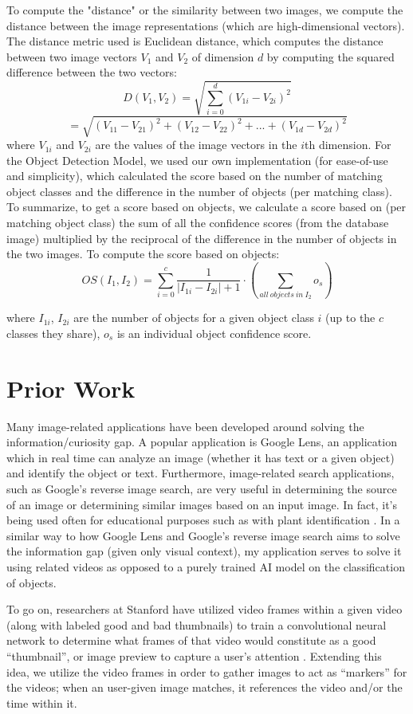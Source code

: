 \documentclass[10pt,twocolumn]{article}
\begin{document}
To compute the "distance" or the similarity between two images, we compute the distance between the image representations (which are high-dimensional vectors). The distance metric used is Euclidean distance, which computes the distance between two image vectors $V_1$ and $V_2$ of dimension $d$ by computing the squared difference between the two vectors: $$D(V_1, V_2) = \sqrt{\sum_{i=0}^{d} (V_{1i} - V_{2i})^2}$$
$$ = \sqrt{(V_{11} - V_{21})^2 + (V_{12} - V_{22})^2 + ... + (V_{1d} - V_{2d})^2 }$$ where $V_{1i}$ and $V_{2i}$ are the values of the image vectors in the $i$th dimension. For the Object Detection Model, we used our own implementation (for ease-of-use and simplicity), which calculated the score based on the number of matching object classes and the difference in the number of objects (per matching class). To summarize, to get a score based on objects, we calculate a score based on (per matching object class) the sum of all the confidence scores (from the database image) multiplied by the reciprocal of the difference in the number of objects in the two images. To compute the score based on objects: $$OS(I_1, I_2) = \sum_{i = 0}^{c} \frac{1}{|I_{1i} - I_{2i}| + 1} \cdot (\sum_{all \ objects \ in \ I_{2}} o_s)$$

where $I_{1i}$, $I_{2i}$ are the number of objects for a given object class $i$ (up to the $c$ classes they share), $o_s$ is an individual object confidence score. 

\section{Prior Work}

Many image-related applications have been developed around solving the information/curiosity gap. A popular application is Google Lens, an application which in real time can analyze an image (whether it has text or a given object) and identify the object or text. Furthermore, image-related search applications, such as Google’s reverse image search, are very useful in determining the source of an image or determining similar images based on an input image. In fact, it’s being used often for educational purposes such as with plant identification \cite{Moore2018}. In a similar way to how Google Lens and Google’s reverse image search aims to solve the information gap (given only visual context), my application serves to solve it using related videos as opposed to a purely trained AI model on the classification of objects.

To go on, researchers at Stanford have utilized video frames within a given video (along with labeled good and bad thumbnails) to train a convolutional neural network to determine what frames of that video would constitute as a good “thumbnail”, or image preview to capture a user’s attention \cite{Stanford2017}. Extending this idea, we utilize the video frames in order to gather images to act as “markers” for the videos; when an user-given image matches, it references the video and/or the time within it.
\end{document}
